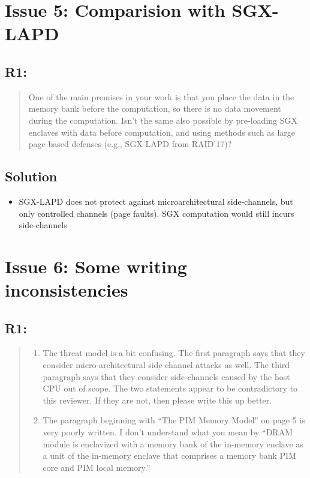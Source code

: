 \documentclass[11pt]{article}
\begin{document}
\section{Issue 5: Comparision with SGX-LAPD}
\label{sec:org74845d1}
\subsection{R1:}
\label{sec:org5a9e6c5}
\begin{quote}
One of the main premises in your work is that you place the data in the memory bank before the computation, so there is no data movement during the computation. Isn't the same also possible by pre-loading SGX enclaves with data before computation, and using methods such as large page-based defenses (e.g., SGX-LAPD from RAID'17)?
\end{quote}
\subsection{Solution}
\label{sec:org6889524}
\begin{itemize}
\item SGX-LAPD does not protect against microarchitectural side-channels, but only controlled channels (page faults). SGX computation would still incurs side-channels
\end{itemize}
\section{Issue 6: Some writing inconsistencies}
\label{sec:orgffe92b7}
\subsection{R1:}
\label{sec:org091556a}
\begin{quote}
\begin{enumerate}
\item The threat model is a bit confusing. The first paragraph says that they consider micro-architectural side-channel attacks as well. The third paragraph says that they consider side-channels caused by the host CPU out of scope. The two statements appear to be contradictory to this reviewer. If they are not, then please write this up better.
\item The paragraph beginning with ``The PIM Memory Model'' on page 5 is very poorly written. I don't understand what you mean by ``DRAM module is enclavized with a memory bank of the in-memory enclave as a unit of the in-memory enclave that comprises a memory bank PIM core and PIM local memory.''
\end{enumerate}
\end{quote}
\end{document}
